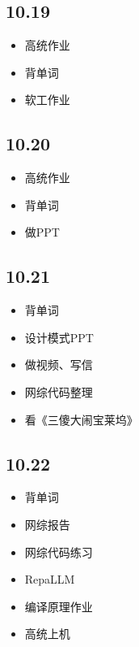 \documentclass[UTF8]{ctexart}
\begin{document}
\subsection*{10.19}
\begin{itemize}
    \item 高统作业
    \item 背单词
    \item 软工作业
\end{itemize}

\subsection*{10.20}
\begin{itemize}
    \item 高统作业
    \item 背单词
    \item 做PPT
\end{itemize}

\subsection*{10.21}
\begin{itemize}
    \item 背单词
    \item 设计模式PPT
    \item 做视频、写信
    \item 网综代码整理
    \item 看《三傻大闹宝莱坞》
\end{itemize}

\subsection*{10.22}
\begin{itemize}
  \item 背单词
  \item 网综报告
  \item 网综代码练习
  \item RepaLLM
  \item 编译原理作业
  \item 高统上机
\end{itemize}
\end{document}
